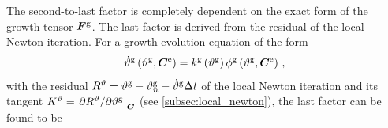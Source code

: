 \documentclass[10pt,letterpaper,oneside]{report}
\newcommand{\ten}[1]{\mbox{\boldmath $#1$}{}}
\newcommand{\scas}[1]{\mbox{{\scriptsize{${\rm{#1}}$}}}{}}
\newcommand{\tens}[1]{\mbox{\boldmath{\scriptsize{$#1$}}}{}}
\begin{document}
The second-to-last factor is completely dependent on the exact form of the growth tensor $\ten{F}^{\scas{g}}$.  
The last factor is derived from the residual of the local Newton iteration.  
For a growth evolution equation of the form 
\begin{equation}
\dot{\vartheta}^{\scas{g}} \left( \vartheta^{\scas{g}}, \ten{C}^{\scas{e}} \right) = k^{\scas{g}} \left( \vartheta^{\scas{g}} \right) \phi^{\scas{g}} \left( \vartheta^{\scas{g}}, \ten{C}^{\scas{e}} \right) \, , 
\end{equation}
with the residual $R^\vartheta = \vartheta^{\scas{g}} - \vartheta^{\scas{g}}_n - \dot{\vartheta}^{\scas{g}} \Delta t$ of the local Newton iteration and its tangent $K^\vartheta = \left. \partial R^\vartheta / \partial \vartheta^{\scas{g}} \right|_{\tens{C}}$ (see \autoref{subsec:local_newton}), the last factor can be found to be
\end{document}
